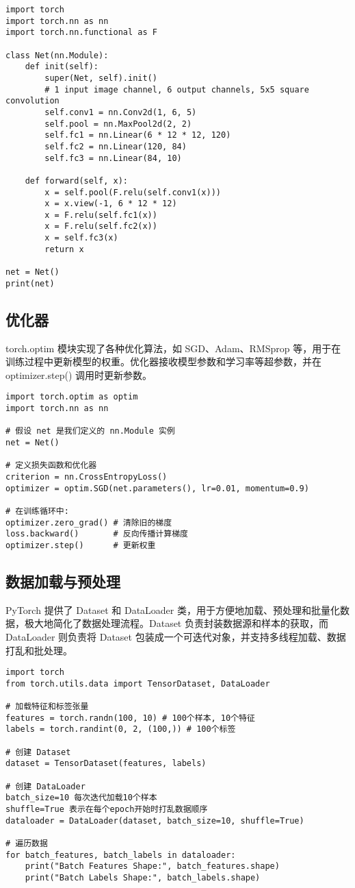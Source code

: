 \documentclass[UTF8]{gyh}
\begin{document}
\begin{lstlisting}
import torch
import torch.nn as nn
import torch.nn.functional as F

class Net(nn.Module):
    def init(self):
        super(Net, self).init()
        # 1 input image channel, 6 output channels, 5x5 square convolution
        self.conv1 = nn.Conv2d(1, 6, 5)
        self.pool = nn.MaxPool2d(2, 2)
        self.fc1 = nn.Linear(6 * 12 * 12, 120)
        self.fc2 = nn.Linear(120, 84)
        self.fc3 = nn.Linear(84, 10)

    def forward(self, x):
        x = self.pool(F.relu(self.conv1(x)))
        x = x.view(-1, 6 * 12 * 12)
        x = F.relu(self.fc1(x))
        x = F.relu(self.fc2(x))
        x = self.fc3(x)
        return x

net = Net()
print(net)
\end{lstlisting}

\subsection{优化器}
torch.optim 模块实现了各种优化算法，如 SGD、Adam、RMSprop 等，用于在训练过程中更新模型的权重。优化器接收模型参数和学习率等超参数，并在 optimizer.step() 调用时更新参数。

\begin{lstlisting}
import torch.optim as optim
import torch.nn as nn

# 假设 net 是我们定义的 nn.Module 实例
net = Net()

# 定义损失函数和优化器
criterion = nn.CrossEntropyLoss()
optimizer = optim.SGD(net.parameters(), lr=0.01, momentum=0.9)

# 在训练循环中:
optimizer.zero_grad() # 清除旧的梯度
loss.backward()       # 反向传播计算梯度
optimizer.step()      # 更新权重
\end{lstlisting}

\subsection{数据加载与预处理}
PyTorch 提供了 Dataset 和 DataLoader 类，用于方便地加载、预处理和批量化数据，极大地简化了数据处理流程。Dataset 负责封装数据源和样本的获取，而 DataLoader 则负责将 Dataset 包装成一个可迭代对象，并支持多线程加载、数据打乱和批处理。

\begin{lstlisting}
import torch
from torch.utils.data import TensorDataset, DataLoader

# 加载特征和标签张量
features = torch.randn(100, 10) # 100个样本, 10个特征
labels = torch.randint(0, 2, (100,)) # 100个标签

# 创建 Dataset
dataset = TensorDataset(features, labels)

# 创建 DataLoader
batch_size=10 每次迭代加载10个样本
shuffle=True 表示在每个epoch开始时打乱数据顺序
dataloader = DataLoader(dataset, batch_size=10, shuffle=True)

# 遍历数据
for batch_features, batch_labels in dataloader:
    print("Batch Features Shape:", batch_features.shape)
    print("Batch Labels Shape:", batch_labels.shape)
\end{lstlisting}
\end{document}
